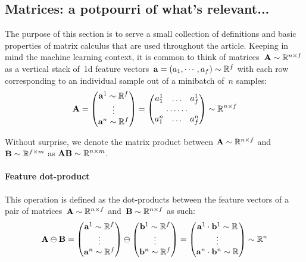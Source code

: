 \documentclass{article}
\begin{document}
\begin{appendices}
\section{Matrices: a potpourri of what's relevant...}

\noindent The purpose of this section is to serve a small collection of definitions and basic properties of matrix calculus that are used throughout the article.  Keeping in mind the machine learning context, it is common to think of matrices~${\bf A} \sim \mathbb{R}^{n\times f}$ as a vertical stack of~1d feature vectors~${\bf a} = (a_1 , \cdots , a_f ) \sim \mathbb{R}^f$ with each row corresponding to an individual sample out of a minibatch of~$n$ samples: \\
\begin{equation} 
{\bf A} = \left(
\begin{matrix}
    {\bf a}^1 \sim \mathbb{R}^f  \\
    \vdots \\
    {\bf a}^n  \sim \mathbb{R}^f
\end{matrix}
\right) = \left(
\begin{matrix}
	a^1_1 & \dots &  a^1_f \\
    \hdotsfor{3} \\
    a^n_1 & \dots &  a^n_f
\end{matrix}
\right) \sim \mathbb{R}^{n\times f}
\end{equation}

\noindent Without surprise, we denote the matrix product between ${\bf A} \sim \mathbb{R}^{n \times f}$ and ${\bf B} \sim \mathbb{R}^{f \times m}$ as ${\bf A} {\bf B} \sim \mathbb{R}^{n 
\times m}$.

\paragraph{Feature dot-product}  This operation is defined as the dot-products between the feature vectors of a pair of matrices~${\bf A} \sim \mathbb{R}^{n \times f}$ and~${\bf B} \sim \mathbb{R}^{n\times f}$ as such:
\begin{equation}
{\bf A} \ominus {\bf B} = \left(
\begin{matrix}
    {\bf a}^1 \sim \mathbb{R}^f  \\
    \vdots \\
    {\bf a}^n  \sim \mathbb{R}^f
\end{matrix}
\right) \ominus \left(
\begin{matrix}
    {\bf b}^1 \sim \mathbb{R}^f  \\
    \vdots \\
    {\bf b}^n  \sim \mathbb{R}^f
\end{matrix}
\right) = \left(
\begin{matrix}
    {\bf a}^1 \cdot {\bf b}^1 \sim \mathbb{R}  \\
    \vdots \\
    {\bf a}^n  \cdot {\bf b}^n \sim \mathbb{R}
\end{matrix}
\right) \sim \mathbb{R}^n
\end{equation}


\end{appendices}
\end{document}
